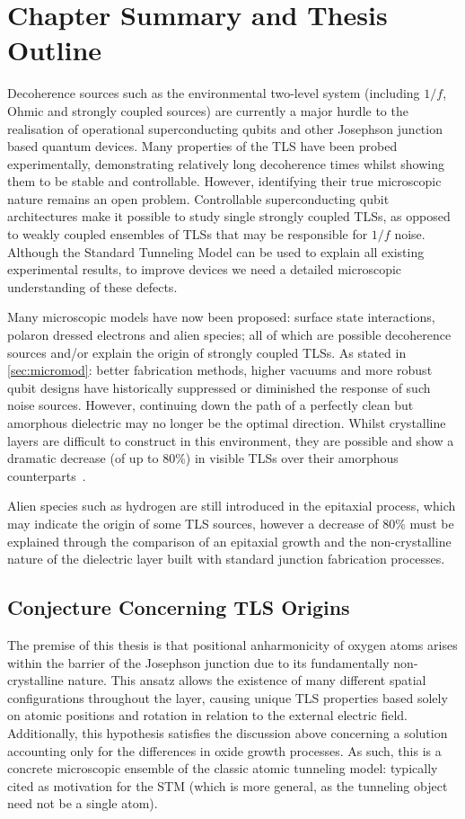 \section{Chapter Summary and Thesis Outline}\label{sec:introsummary}

Decoherence sources such as the environmental two-level system (including $1/f$, Ohmic and strongly coupled sources) are currently a major hurdle to the realisation of operational superconducting qubits and other Josephson junction based quantum devices.
Many properties of the TLS have been probed experimentally, demonstrating relatively long decoherence times whilst showing them to be stable and controllable.
However, identifying their true microscopic nature remains an open problem. Controllable superconducting qubit architectures make it possible to study single strongly coupled TLSs, as opposed to weakly coupled ensembles of TLSs that may be responsible for $1/f$ noise.
Although the Standard Tunneling Model can be used to explain all existing experimental results, to improve devices we need a detailed microscopic understanding of these defects.

Many microscopic models have now been proposed: surface state interactions, polaron dressed electrons and alien species; all of which are possible decoherence sources and/or explain the origin of strongly coupled TLSs.
As stated in \cref{sec:micromod}: better fabrication methods, higher vacuums and more robust qubit designs have historically suppressed or diminished the response of such noise sources.
However, continuing down the path of a perfectly clean but amorphous dielectric may no longer be the optimal direction.
Whilst crystalline layers are difficult to construct in this environment, they are possible and show a dramatic decrease (of up to 80\%) in visible TLSs over their amorphous counterparts~\cite{Oh2006}.

Alien species such as hydrogen are still introduced in the epitaxial process, which may indicate the origin of some TLS sources, however a decrease of 80\% must be explained through the comparison of an epitaxial growth and the non-crystalline nature of the dielectric layer built with standard junction fabrication processes.

\subsection{Conjecture Concerning TLS Origins}\label{sec:conjecture}

The premise of this thesis is that positional anharmonicity of oxygen atoms arises within the  barrier of the Josephson junction due to its fundamentally non-crystalline nature.
This ansatz allows the existence of many different spatial configurations throughout the layer, causing unique TLS properties based solely on atomic positions and rotation in relation to the external electric field.
Additionally, this hypothesis satisfies the discussion above concerning a solution accounting only for the differences in oxide growth processes.
As such, this is a concrete microscopic ensemble of the classic atomic tunneling model: typically cited as motivation for the STM (which is more general, as the tunneling object need not be a single atom).


